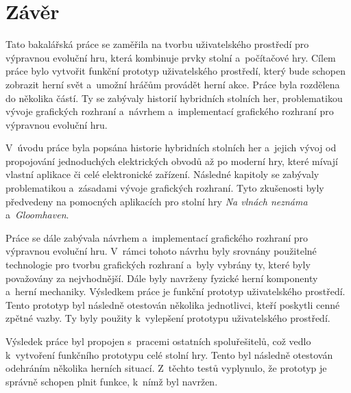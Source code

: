 \chapter{Závěr}
Tato bakalářská práce se zaměřila na tvorbu uživatelského prostředí pro výpravnou evoluční hru, která kombinuje prvky stolní a~počítačové hry. Cílem práce bylo vytvořit funkční prototyp uživatelského prostředí, který bude schopen zobrazit herní svět a~umožní hráčům provádět herní akce. Práce byla rozdělena do několika částí. Ty se zabývaly historií hybridních stolních her, problematikou vývoje grafických rozhraní a~návrhem a~implementací grafického rozhraní pro výpravnou evoluční hru.

V~úvodu práce byla popsána historie hybridních stolních her a~jejich vývoj od propojování jednoduchých elektrických obvodů až po moderní hry, které mívají vlastní aplikace či celé elektronické zařízení. Následné kapitoly se zabývaly problematikou a~zásadami vývoje grafických rozhraní. Tyto zkušenosti byly předvedeny na pomocných aplikacích pro stolní hry \textit{Na vlnách neznáma} a~\textit{Gloomhaven}.

Práce se dále zabývala návrhem a~implementací grafického rozhraní pro výpravnou evoluční hru. V~rámci tohoto návrhu byly srovnány použitelné technologie pro tvorbu grafických rozhraní a~byly vybrány ty, které byly považovány za nejvhodnější. Dále byly navrženy fyzické herní komponenty a~herní mechaniky. Výsledkem práce je funkční prototyp uživatelského prostředí. Tento prototyp byl následně otestován několika jednotlivci, kteří poskytli cenné zpětné vazby. Ty byly použity k~vylepšení prototypu uživatelského prostředí.

Výsledek práce byl propojen s~pracemi ostatních spoluřešitelů, což vedlo k~vytvoření funkčního prototypu celé stolní hry. Tento byl následně otestován odehráním několika herních situací. Z~těchto testů vyplynulo, že prototyp je správně schopen plnit funkce, k~nímž byl navržen.